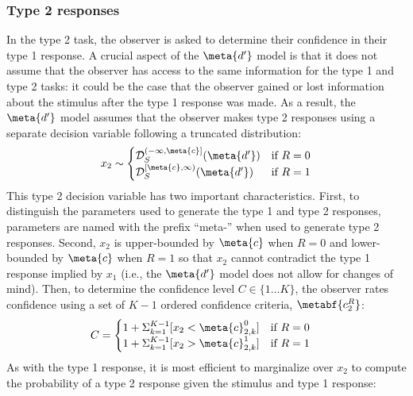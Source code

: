 \subsubsection{Type 2 responses}
In the type 2 task, the observer is asked to determine their confidence in their type 1 response. A crucial aspect of the $\meta{d'}$ model is that it does not assume that the observer has access to the same information for the type 1 and type 2 tasks: it could be the case that the observer gained or lost information about the stimulus after the type 1 response was made. As a result, the $\meta{d'}$ model assumes that the observer makes type 2 responses using a separate decision variable following a truncated distribution:
\begin{align*}
    x_2 \sim \begin{cases}
        \mathcal{D}_S^{(-\infty, \meta{c}]}(\meta{d'}) & \textrm{if } R=0 \\
        \mathcal{D}_S^{[\meta{c}, \infty)}(\meta{d'}) & \textrm{if } R=1
\end{cases}
\end{align*}
This type 2 decision variable has two important characteristics. First, to distinguish the parameters used to generate the type 1 and type 2 responses, parameters are named with the prefix ``meta-'' when used to generate type 2 responses. Second, $x_2$ is upper-bounded by $\meta{c}$ when $R=0$ and lower-bounded by $\meta{c}$ when $R=1$ so that $x_2$ cannot contradict the type 1 response implied by $x_1$ (i.e., the $\meta{d'}$ model does not allow for changes of mind). Then, to determine the confidence level $C \in \{ 1 \ldots K\}$, the observer rates confidence using a set of $K-1$ ordered confidence criteria, $\metabf{c_2^R}$:
\begin{align*}
    C &= \begin{cases}
    1+\Sigma_{k=1}^{K-1}[x_2 < \meta{c}_{2,k}^0] & \textrm{if } R=0 \\
    1+\Sigma_{k=1}^{K-1} [x_2 > \meta{c}_{2,k}^1] & \textrm{if } R=1
    \end{cases}
\end{align*}
As with the type 1 response, it is most efficient to marginalize over $x_2$ to compute the probability of a type 2 response given the stimulus and type 1 response:
